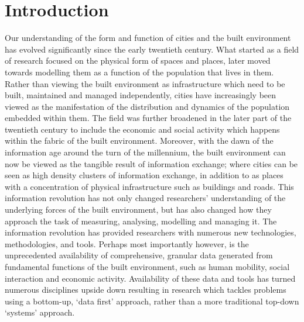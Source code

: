 \chapter{Introduction}

Our understanding of the form and function of cities and the built environment has evolved significantly since the early twentieth century.
What started as a field of research focused on the physical form of spaces and places, later moved towards modelling them as a function of the population that lives in them.
Rather than viewing the built environment as infrastructure which need to be built, maintained and managed independently, cities have increasingly been viewed as the manifestation of the distribution and dynamics of the population embedded within them.
The field was further broadened in the later part of the twentieth century to include the economic and social activity which happens within the fabric of the built environment.
Moreover, with the dawn of the information age around the turn of the millennium, the built environment can now be viewed as the tangible result of information exchange; where cities can be seen as high density clusters of information exchange, in addition to as places with a concentration of physical infrastructure such as buildings and roads.
This information revolution has not only changed researchers' understanding of the underlying forces of the built environment, but has also changed how they approach the task of measuring, analysing, modelling and managing it.
The information revolution has provided researchers with numerous new technologies, methodologies, and tools.
Perhaps most importantly however, is the unprecedented availability of comprehensive, granular data generated from fundamental functions of the built environment, such as human mobility, social interaction and economic activity.
Availability of these data and tools has turned numerous disciplines upside down resulting in research which tackles problems using a bottom-up, `data first' approach, rather than a more traditional top-down `systems' approach. 

